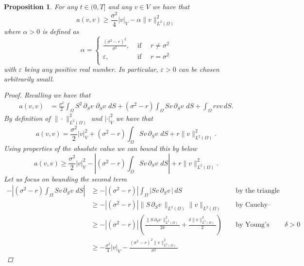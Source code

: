 \documentclass{article}
\newtheorem{prop}[thm]{Proposition}
\newcommand{\intS}[1]{\ensuremath{\int_{\Omega}#1 \, dS}}
\newcommand{\darg}[2]{\ensuremath{\, \partial_{#2}#1} \, }
\newcommand{\dS}[1]{\ensuremath{\darg{#1}{S}}}
\newcommand{\dSv}{\dS{v}}
\newcommand{\sigmafrac}{\ensuremath{\frac{\sigma^2}{2}}}
\newcommand{\seminorm}[1]{\ensuremath{|#1|_V}}
\newcommand{\norm}[1]{\ensuremath{\|#1\|_{L^2(\Omega)}}}
\newcommand{\seminormsq}[1]{\ensuremath{|#1|_V^2}}
\newcommand{\normsq}[1]{\ensuremath{\|#1\|_{L^2(\Omega)}^2}}
\newcommand{\aform}[2]{\ensuremath{\sigmafrac \intS{S^2 \dS{#2} \dS{#1}} + (\sigma^2 - r) \intS{S #2 \dS{#1}} + \intS{r  #1  #2}}}
\begin{document}
\begin{prop}\label{prop:ineq_a}
    For any $t \in (0,T]$ and any $v \in V$ we have that
    \begin{equation*}
        a(v,v) \geq \frac{\sigma^2}{4} \seminorm{v} - \alpha \normsq{v}
    \end{equation*}
    where $\alpha > 0$ is defined as
    \begin{equation*}
        \alpha = \begin{cases}
            \frac{(\sigma^2 - r)^2}{ \sigma^2}, &\text{ if } \quad r \neq \sigma^2\\
            \varepsilon, &\text{ if } \quad r = \sigma^2\\
        \end{cases}
    \end{equation*}
    with $\varepsilon$ being any positive real number. In particular, $\varepsilon >0$ can be chosen arbitrarily small.
    \begin{proof}
        Recalling  we have that
        \begin{align*}
            a(v,v) &= \aform{v}{v}.
        \end{align*}
        By definition of $\normsq{\cdot}$ and $\seminormsq{\cdot}$ we have that
        \begin{equation*}
            a(v,v) = \sigmafrac \seminormsq{v} + (\sigma^2 - r) \intS{S v \dSv} + r \normsq{v}.
        \end{equation*}
        Using properties of the absolute value we can bound this by below
        \begin{equation}\label{eq:first_lower_bound_a}
            a(v,v) \geq \sigmafrac \seminormsq{v} - \left| (\sigma^2 - r) \intS{S v \dSv}\right| + r \normsq{v}.
        \end{equation}
        Let us focus on bounding the second term
        \begin{align*}
            - \left| (\sigma^2 - r) \intS{S v \dSv}\right| &\geq - \left| (\sigma^2 - r) \right| \intS{\left|S v \dSv \right|} && \text{ by the triangle inequality}\\
            &\geq -\left| (\sigma^2 - r) \right| \norm{S \dSv} \norm{v} && \text{ by Cauchy–Schwarz inequality}\\
            &\geq -\left| (\sigma^2 - r) \right| \left( \frac{ \normsq{S \dSv}}{2 \delta} + \frac{\delta \normsq{v}}{2}\right) && \text{ by Young's inequality, $\delta >0$}\\
            & \geq - \frac{\sigma^2}{4} \seminorm{v} - \frac{(\sigma^2 - r)^2 \normsq{v}}{ \sigma^2}

\end{align*}
\end{proof}
\end{prop}
\end{document}
